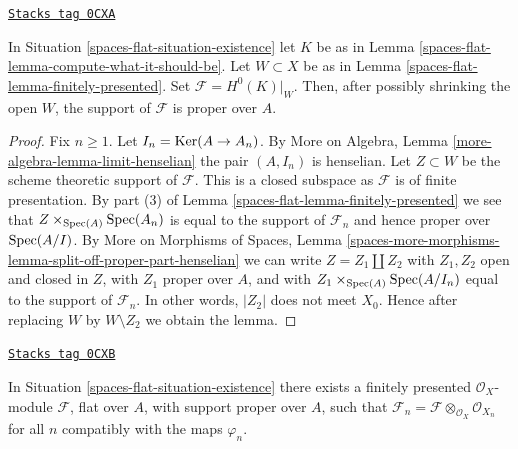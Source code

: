 \begin{lemma}
\label{spaces-flat-lemma-proper-support}
\href{https://stacks.math.columbia.edu/tag/0CXA}{\texttt{Stacks tag 0CXA}}

In Situation \ref{spaces-flat-situation-existence} let $K$ be as in
Lemma \ref{spaces-flat-lemma-compute-what-it-should-be}. Let $W \subset X$
be as in Lemma \ref{spaces-flat-lemma-finitely-presented}.
Set $\mathcal{F} = H^0(K)|_W$. Then, after possibly shrinking the open $W$,
the support of $\mathcal{F}$ is proper over $A$.
\end{lemma}

\begin{proof}
Fix $n \geq 1$. Let $I_n = \operatorname{Ker}(A \to A_n)$.
By More on Algebra, Lemma \ref{more-algebra-lemma-limit-henselian}
the pair $(A, I_n)$ is henselian.
Let $Z \subset W$ be the scheme theoretic support of $\mathcal{F}$.
This is a closed subspace as $\mathcal{F}$ is of finite presentation.
By part (3) of Lemma \ref{spaces-flat-lemma-finitely-presented}
we see that $Z \times_{\operatorname{Spec}(A)} \operatorname{Spec}(A_n)$
is equal to the support of $\mathcal{F}_n$ and hence
proper over $\operatorname{Spec}(A/I)$.
By More on Morphisms of Spaces, Lemma
\ref{spaces-more-morphisms-lemma-split-off-proper-part-henselian}
we can write $Z = Z_1 \amalg Z_2$ with $Z_1, Z_2$ open and
closed in $Z$, with $Z_1$ proper
over $A$, and with $Z_1 \times_{\operatorname{Spec}(A)} \operatorname{Spec}(A/I_n)$
equal to the support of $\mathcal{F}_n$.
In other words, $|Z_2|$ does not meet $X_0$.
Hence after replacing $W$ by $W \setminus Z_2$ we obtain the lemma.
\end{proof}

\begin{theorem}

\label{spaces-flat-theorem-existence}
\href{https://stacks.math.columbia.edu/tag/0CXB}{\texttt{Stacks tag 0CXB}}

In Situation \ref{spaces-flat-situation-existence}
there exists a finitely presented $\mathcal{O}_X$-module
$\mathcal{F}$, flat over $A$, with support proper over $A$,
such that
$\mathcal{F}_n = \mathcal{F} \otimes_{\mathcal{O}_X} \mathcal{O}_{X_n}$
for all $n$ compatibly with the maps $\varphi_n$.
\end{theorem}

